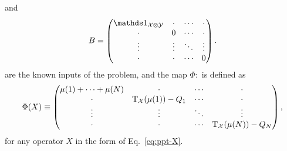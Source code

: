 and
\begin{equation}  
  B = 
  \begin{pmatrix}
      \I_{\X\otimes\Y} & \cdot & \cdots & \cdot \\
        \cdot  & 0 & \cdots & \cdot\\
        \vdots & \vdots & \ddots & \vdots\\
        \cdot  & \cdot & \cdots & 0
    \end{pmatrix}.
\end{equation}
are the known inputs of the problem, and the map $\Phi : $ is defined as 
\begin{equation}
  \Phi(X) \equiv \begin{pmatrix}
      \mu(1) + \cdots +\mu(N) & \cdot & \cdots & \cdot \\
        \cdot  & \operatorname{T}_{\mathcal{X}}(\mu(1)) - Q_{1} & \cdots & \cdot\\
        \vdots &\vdots & \ddots & \vdots\\
        \cdot  &\cdot & \cdots & \operatorname{T}_{\mathcal{X}}(\mu(N)) - Q_{N}
    \end{pmatrix},
\end{equation}
for any operator $X$ in the form of Eq.~\eqref{eq:ppt-X}.

